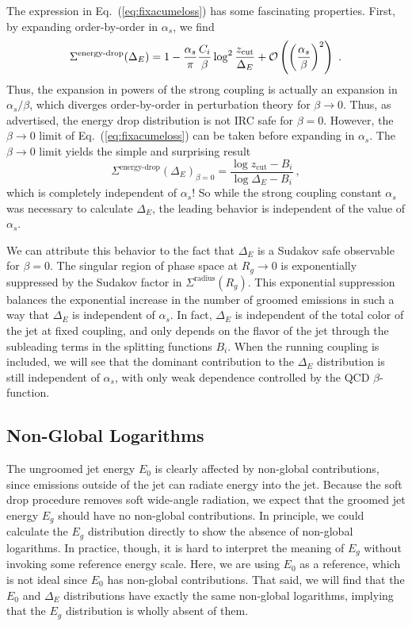 \documentclass[letterpaper,11pt]{article}
\newcommand{\as}{\alpha_s}
\newcommand{\zcut}{z_\text{cut}}
\DeclareRobustCommand{\Eq}[1]{Eq.~(\ref{#1})}
\begin{document}
The expression in \Eq{eq:fixacumeloss} has some fascinating properties.  First, by expanding order-by-order in $\alpha_s$, we find 
\begin{equation}
\Sigma^\text{energy-drop}(\Delta_E) = 1-\frac{\alpha_s}{\pi}\frac{C_i}{\beta}\log^2\frac{\zcut}{\Delta_E} + {\cal O}\left(\left(\frac{\alpha_s}{\beta}\right)^2\right) \ .
\end{equation}
Thus, the expansion in powers of the strong coupling is actually an expansion in $\as/\beta$, which diverges order-by-order in perturbation theory for $\beta \to 0$.  Thus, as advertised, the energy drop distribution is not IRC safe for $\beta=0$.
However, the $\beta \to 0$ limit of \Eq{eq:fixacumeloss} can be taken before expanding in $\alpha_s$.  The $\beta \to 0$ limit yields the simple and surprising result
\begin{equation}
\label{eq:energydropnoalpha}
\Sigma^\text{energy-drop}(\Delta_E)_{\beta = 0} = \frac{\log \zcut - B_i}{\log \Delta_E - B_i} \ ,
\end{equation}
which is completely independent of $\alpha_s$!  So while the strong coupling constant $\alpha_s$ was necessary to calculate $\Delta_E$, the leading behavior is independent of the value of $\alpha_s$.

We can attribute this behavior to the fact that $\Delta_E$ is a Sudakov safe observable for $\beta=0$.  The singular region of phase space at $R_g \to 0$ is exponentially suppressed by the Sudakov factor in $\Sigma^\text{radius}(R_g)$.  This exponential suppression balances the exponential increase in the number of groomed emissions in such a way that $\Delta_E$ is independent of $\alpha_s$.  In fact, $\Delta_E$ is independent of the total color of the jet at fixed coupling, and only depends on the flavor of the jet through the subleading terms in the splitting functions $B_i$.   When the running coupling is included, we will see that the dominant contribution to the $\Delta_E$ distribution is still independent of $\alpha_s$, with only weak dependence controlled by the QCD $\beta$-function.



\subsection{Non-Global Logarithms}
\label{sec:NGforDeltaE}

The ungroomed jet energy $E_0$ is clearly affected by non-global contributions, since emissions outside of the jet can radiate energy into the jet.  Because the soft drop procedure removes soft wide-angle radiation, we expect that the groomed jet energy $E_g$ should have no non-global contributions.  In principle, we could calculate the $E_g$ distribution directly to show the absence of non-global logarithms.  In practice, though, it is hard to interpret the meaning of $E_g$ without invoking some reference energy scale.  Here, we are using $E_0$ as a reference, which is not ideal since $E_0$ has non-global contributions.  That said, we will find that the $E_0$ and $\Delta_E$ distributions have exactly the same non-global logarithms, implying that the $E_g$ distribution is wholly absent of them. 
\end{document}
